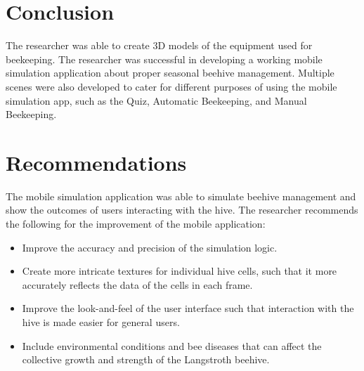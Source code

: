 \documentclass[journal]{./IEEE/IEEEtran}
\begin{document}
\section{Conclusion}
 The researcher was able to create 3D models of the equipment used for beekeeping. The researcher was successful in developing a working mobile simulation application about proper seasonal beehive management. Multiple scenes were also developed to cater for different purposes of using the mobile simulation app, such as the Quiz, Automatic Beekeeping, and Manual Beekeeping. 

\section{Recommendations}
The mobile simulation application was able to simulate beehive management and show the outcomes of users interacting with the hive. The researcher recommends the following for the improvement of the mobile application:
\begin{itemize}
    \item Improve the accuracy and precision of the simulation logic.
    \item Create more intricate textures for individual hive cells, such that it more accurately reflects the data of the cells in each frame.
    \item Improve the look-and-feel of the user interface such that interaction with the hive is made easier for general users.
    \item Include environmental conditions and bee diseases that can affect the collective growth and strength of the Langstroth beehive.
\end{itemize}
\end{document}

